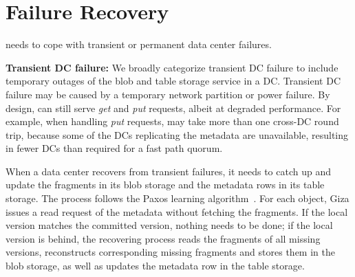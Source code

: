 \section{Failure Recovery}


\name needs to cope with transient or permanent data center failures.

{\bf Transient DC failure:}
We broadly categorize transient DC failure to include temporary outages of the blob
and table storage service in a DC. 
Transient DC failure may be caused by a temporary network partition or power failure.
By design, {\name} can still serve {\em get} and {\em put} requests, albeit at degraded performance. 
For example, when handling {\em put} requests,
\name may take more than one cross-DC round trip,
because some of the DCs replicating the metadata are unavailable,
resulting in fewer DCs than required for a fast path quorum.

When a data center recovers from transient failures,
it needs to catch up and update the fragments in its blob storage
and the metadata rows in its table storage. 
The process follows the Paxos learning algorithm~\cite{lamport01paxos}.
For each object, Giza issues a read request of the metadata without fetching the fragments.
If the local version matches the committed version, nothing needs to be done;
if the local version is behind,
the recovering process reads the fragments of all missing versions,
reconstructs corresponding missing fragments and stores them in the blob storage,
as well as updates the metadata row in the table storage.


